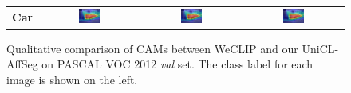 \begin{figure}[ht]
\begin{tabular}{c c c c}
    \textbf{Car}       & \includegraphics[width=0.23\textwidth]{figures/qualitative_analysis/test_cam/2010_005860_6.jpg} & \includegraphics[width=0.23\textwidth]{figures/qualitative_analysis/test_cam/2010_005860_6.jpg} & \includegraphics[width=0.23\textwidth]{figures/qualitative_analysis/test_cam/2010_005860_6.jpg} \\
  \end{tabular}

  \caption{Qualitative comparison of CAMs between WeCLIP and our UniCL-AffSeg on PASCAL VOC 2012 \textit{val} set. The class label for each image is shown on the left.}
  \label{fig:qualitative_comparison_cam_val}
\end{figure}

